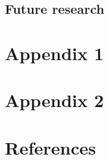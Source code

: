 \documentclass{article}
\begin{document}
 \subsection{Future research}
 
 \begin{appendices}
  \section{Appendix 1}
  \section{Appendix 2}
 \end{appendices}
 
 \section*{References}
 
 
\end{document}
